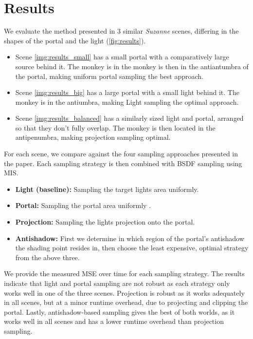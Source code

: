 \section{Results}
\label{sec:results}
We evaluate the method presented in 3 similar \emph{Suzanne} scenes, differing in the shapes of the portal and the light (\ref{fig:results}). 

\begin{itemize}
\item Scene \autoref{img:results_small} has a small portal with a comparatively large source behind it. The monkey is in the monkey is then in the antiantumbra of the portal, making uniform portal sampling the best approach.

\item Scene \autoref{img:results_big} has a large portal with a small light behind it. The monkey is in the antiumbra, making Light sampling the optimal approach.

\item Scene \autoref{img:results_balanced} has a similarly sized light and portal, arranged so that they don't fully overlap. The monkey is then located in the antipenumbra, making projection sampling optimal.
\end{itemize}

For each scene, we compare against the four sampling approaches presented in the paper. Each sampling strategy is then combined with BSDF sampling using MIS.

\begin{itemize}
    \item \textbf{Light (baseline):} Sampling the target lights area uniformly.
    \item \textbf{Portal:} Sampling the portal area uniformly .
    \item \textbf{Projection:} Sampling the lights projection onto the portal.
    \item \textbf{Antishadow:} First we determine in which region of the portal's antishadow the shading point resides in, then choose the least expensive, optimal strategy from the above three.
\end{itemize}

We provide the measured MSE over time for each sampling strategy. The results indicate that light and portal sampling are not robust as each strategy only works well in one of the three scenes. Projection is robust as it works adequately in all scenes, but at a minor runtime overhead, due to projecting and clipping the portal. Lastly, antishadow-based sampling gives the best of both worlds, as it works well in all scenes and has a lower runtime overhead than projection sampling.

